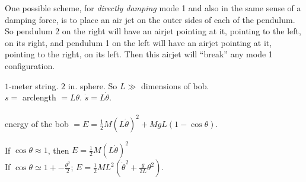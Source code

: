 \documentclass[twoside,10pt]{amsart}
\newcommand{\problemhead}[1]
  {\smallskip
   \noindent{\large\bf Problem #1.}
   \smallskip}
\begin{document}
One possible scheme, for \emph{ directly damping } mode 1 and also in the same sense of a damping force, is to place an air jet on the outer sides of each of the pendulum.  So pendulum 2 on the right will have an airjet pointing at it, pointing to the left, on its right, and pendulum 1 on the left will have an airjet pointing at it, pointing to the right, on its left.  Then this airjet will ``break'' any mode 1 configuration.  

\problemhead{1.9} $1$-meter string.  $2$ in. sphere.  So $L \gg$ dimensions of bob.  \\
$s = $ arclength $ = L \theta$.  $\dot{s} = L \dot{\theta}$.  \\ \, \\
energy of the bob $= E = \frac{1}{2} M (L \dot{\theta})^2 + MgL (1- \cos{\theta})$.  

If $\cos{\theta} \approx 1$, then $E = \frac{1}{2} M (L \dot{\theta})^2$ \\
If $\cos{\theta} \simeq 1 + - \frac{\theta^2}{2}$;  $E = \frac{1}{2} ML^2 (\dot{\theta}^2 + \frac{g}{2L} \theta^2 )$.  
\end{document}
